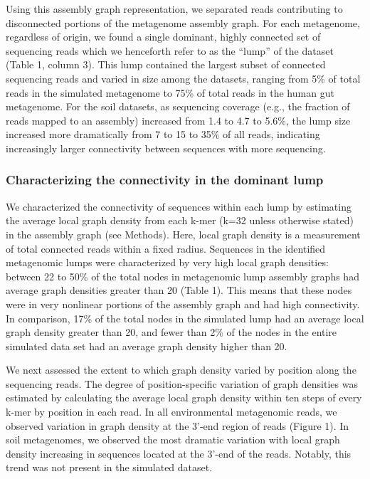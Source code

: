 \documentclass[10pt]{article}
\begin{document}
Using this assembly graph representation, we separated reads
contributing to disconnected portions of the metagenome assembly graph.
For each metagenome, regardless of origin, we found a
single dominant, highly connected set of sequencing reads which we
henceforth refer to as the ``lump'' of the dataset (Table 1, column
3).  This lump contained the largest subset of connected sequencing
reads and varied in size among the datasets, ranging from 5\% of total
reads in the simulated metagenome to 75\% of total reads in the human
gut metagenome.  For the soil datasets, as sequencing coverage (e.g.,
the fraction of reads mapped to an assembly) increased from 1.4 to 4.7
to 5.6\%, the lump size increased more dramatically from 7 to 15 to
35\% of all reads, indicating increasingly larger connectivity between
sequences with more sequencing.

\subsubsection*{Characterizing the connectivity in the dominant lump}

We characterized the connectivity of sequences
within each lump by estimating the average local graph density from
each k-mer (k=32 unless otherwise stated) in the assembly graph (see
Methods).  Here, local graph density is a measurement of total
connected reads within a fixed radius.  Sequences
in the identified metagenomic lumps were characterized by very high
local graph densities: between 22 to 50\% of the total nodes in
metagenomic lump assembly graphs had average graph densities greater
than 20 (Table 1).  This means that these nodes were in very nonlinear portions of the assembly graph and had high connectivity.  In comparison, 17\% of the total nodes in the
simulated lump had an average local graph density greater than 20, and
fewer than 2\% of the nodes in the entire simulated data set had an
average graph density higher than 20.

We next assessed the extent to which graph density varied by position
along the sequencing reads.  The degree of position-specific variation of
graph densities was estimated by calculating the average local graph
density within ten steps of every k-mer by position in each read.  In
all environmental metagenomic reads, we observed variation in graph
density at the 3'-end region of reads (Figure 1).  In soil
metagenomes, we observed the most dramatic variation with local graph
density increasing in sequences located at the 3'-end of the reads.
Notably, this trend was not present in the simulated dataset.
\end{document}
